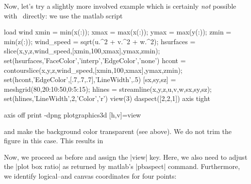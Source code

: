 {\begin{codeexample}[]
\end{codeexample}

Now, let's try a slightly more involved example which is certainly \emph{not} possible with \PGFPlots\ directly: we use the matlab script
\begin{codeexample}
load wind
xmin = min(x(:));
xmax = max(x(:));
ymax = max(y(:));
zmin = min(z(:));
wind_speed = sqrt(u.^2 + v.^2 + w.^2);
hsurfaces = slice(x,y,z,wind_speed,[xmin,100,xmax],ymax,zmin);
set(hsurfaces,'FaceColor','interp','EdgeColor','none')
hcont = contourslice(x,y,z,wind_speed,[xmin,100,xmax],ymax,zmin);
set(hcont,'EdgeColor',[.7,.7,.7],'LineWidth',.5)
[sx,sy,sz] = meshgrid(80,20:10:50,0:5:15);
hlines = streamline(x,y,z,u,v,w,sx,sy,sz);
set(hlines,'LineWidth',2,'Color','r')
view(3)
daspect([2,2,1])
axis tight

axis off
print -dpng plotgraphics3d
[h,v]=view
\end{codeexample}
\noindent and make the background color transparent (see above). We do not trim the figure in this case. This results in

{\setlength{\fboxsep}{0pt}%
%
}%

Now, we proceed as before and assign the |view| key. Here, we also need to adjust the |plot box ratio| as returned by matlab's |pbaspect| command. Furthermore, we identify logical--and canvas coordinates for four points:
\begin{codeexample}[]
\end{codeexample}}

